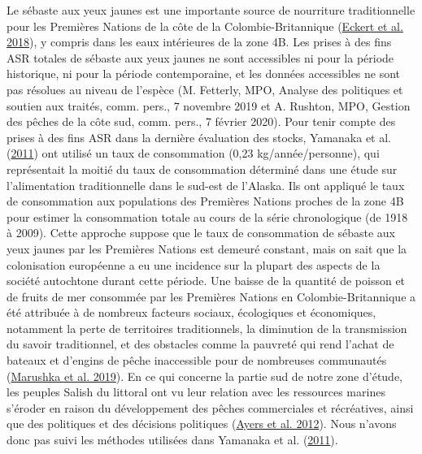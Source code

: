 \documentclass[french,11pt]{book}
\begin{document}
Le sébaste aux yeux jaunes est une importante source de nourriture traditionnelle pour les Premières Nations de la côte de la Colombie-Britannique (\protect\hyperlink{ref-eckert2018}{Eckert et al. 2018}), y compris dans les eaux intérieures de la zone 4B. Les prises à des fins ASR totales de sébaste aux yeux jaunes ne sont accessibles ni pour la période historique, ni pour la période contemporaine, et les données accessibles ne sont pas résolues au niveau de l'espèce (M. Fetterly, MPO, Analyse des politiques et soutien aux traités, comm. pers., 7 novembre 2019 et A. Rushton, MPO, Gestion des pêches de la côte sud, comm. pers., 7 février 2020). Pour tenir compte des prises à des fins ASR dans la dernière évaluation des stocks, Yamanaka et al. (\protect\hyperlink{ref-yamanaka2011}{2011}) ont utilisé un taux de consommation (0,23 kg/année/personne), qui représentait la moitié du taux de consommation déterminé dans une étude sur l'alimentation traditionnelle dans le sud-est de l'Alaska. Ils ont appliqué le taux de consommation aux populations des Premières Nations proches de la zone 4B pour estimer la consommation totale au cours de la série chronologique (de 1918 à 2009). Cette approche suppose que le taux de consommation de sébaste aux yeux jaunes par les Premières Nations est demeuré constant, mais on sait que la colonisation européenne a eu une incidence sur la plupart des aspects de la société autochtone durant cette période. Une baisse de la quantité de poisson et de fruits de mer consommée par les Premières Nations en Colombie-Britannique a été attribuée à de nombreux facteurs sociaux, écologiques et économiques, notamment la perte de territoires traditionnels, la diminution de la transmission du savoir traditionnel, et des obstacles comme la pauvreté qui rend l'achat de bateaux et d'engins de pêche inaccessible pour de nombreuses communautés (\protect\hyperlink{ref-marushka2019}{Marushka et al. 2019}). En ce qui concerne la partie sud de notre zone d'étude, les peuples Salish du littoral ont vu leur relation avec les ressources marines s'éroder en raison du développement des pêches commerciales et récréatives, ainsi que des politiques et des décisions politiques (\protect\hyperlink{ref-ayers2012}{Ayers et al. 2012}). Nous n'avons donc pas suivi les méthodes utilisées dans Yamanaka et al. (\protect\hyperlink{ref-yamanaka2011}{2011}).
\end{document}
